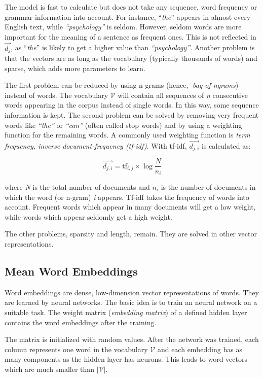 The model is fast to calculate but does not take any sequence, word frequency or grammar information into account. For instance, \enquote{\emph{the}} appears in almost every English text, while \emph{\enquote{psychology}} is seldom. However, seldom words are more important for the meaning of a sentence as frequent ones. This is not reflected in $\vec{d_j}$, as \enquote{\emph{the}} is likely to get a higher value than \emph{\enquote{psychology}}. Another problem is that the vectors are as long as the vocabulary (typically thousands of words) and sparse, which adds more parameters to learn.

The first problem can be reduced by using n-grams (hence, \emph{bag-of-ngrams}) instead of words. The vocabulary $\mathcal{V}$ will contain all sequences of \emph{n} consecutive words appearing in the corpus instead of single words. In this way, some sequence information is kept. The second problem can be solved by removing very frequent words like \emph{\enquote{the}} or \emph{\enquote{can}} (often called stop words) and by using a weighting function for the remaining words. A commonly used weighting function is \emph{term frequency, inverse document-frequency (tf-idf)}. With tf-idf, $\vec{d_{j,i}}$ is calculated as:

\[\vec{d_{j,i}} = \text{tf}_{i,j} \times \log{ \frac{N}{n_i} } \]

where \emph{N} is the total number of documents and $n_i$ is the number of documents in which the word (or n-gram) \emph{i} appears. Tf-idf takes the frequency of words into account. Frequent words which appear in many documents will get a low weight, while words which appear seldomly get a high weight.

The other problems, sparsity and length, remain. They are solved in other vector representations.


\subsection{Mean Word Embeddings}
Word embeddings are dense, low-dimension vector representations of words. They are learned by neural networks. The basic idea is to train an neural network on a suitable task. The weight matrix (\emph{embedding matrix}) of a defined hidden layer contains the word embeddings after the training.

The matrix is initialized with random values. After the network was trained, each column represents one word in the vocabulary $\mathcal{V}$ and each embedding has as many components as the hidden layer has neurons. This leads to word vectors which are much smaller than $|\mathcal{V}|$.

